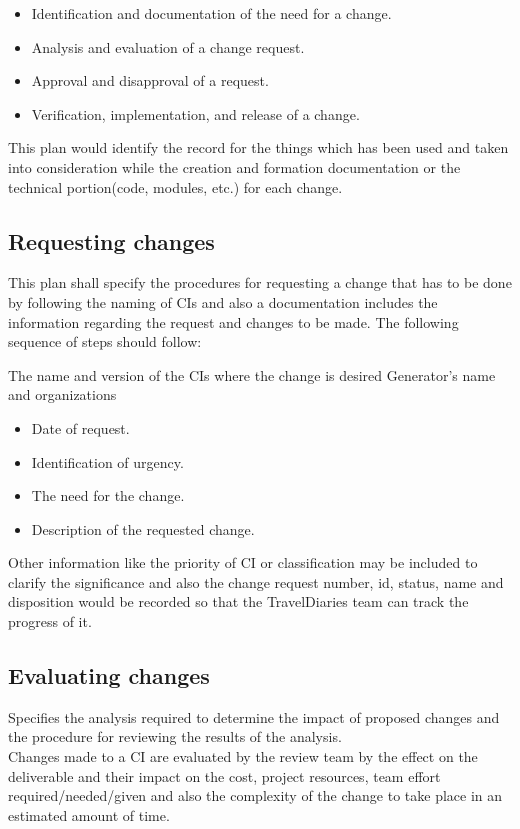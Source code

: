 \documentclass[]{article}
\begin{document}
\begin{itemize}
\item Identification and documentation of the need for a change.
\item Analysis and evaluation of a change request.
\item Approval and disapproval of a request.
\item Verification, implementation, and release of a change.

\end{itemize}

This plan would identify the record for the things which has been used and taken into consideration while the creation and formation documentation or the technical portion(code, modules, etc.) for each change.

\subsection{Requesting changes}
This plan shall specify the procedures for requesting a change that has to be done by following the naming of CIs and also a documentation includes the information regarding the request and changes to be made. The following sequence of steps should follow:


The name and version of the CIs where the change is desired
Generator’s name and organizations

\begin{itemize}
\item Date of request.
\item Identification of urgency.
\item The need for the change.
\item Description of the requested change.

\end{itemize}
Other information like the priority of CI or classification may be included to clarify the significance and also the change request number, id, status, name and disposition would be recorded so that the TravelDiaries team can track the progress of it.

\subsection{Evaluating changes}
Specifies the analysis required to determine the
impact of proposed changes and the procedure for
reviewing the results of the analysis.\\
Changes made to a CI are evaluated by the review team by the effect on the deliverable and their impact on the cost, project resources, team effort required/needed/given and also the complexity of the change to take place in an estimated amount of time.
\end{document}
